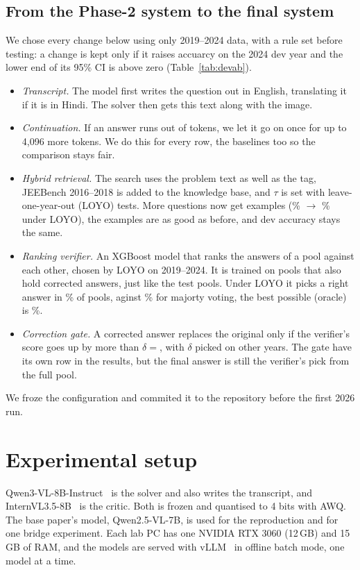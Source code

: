 \documentclass[conference]{IEEEtran}
\begin{document}
\subsection{From the Phase-2 system to the final system}
We chose every change below using only 2019--2024 data, with a rule set before testing: a
change is kept only if it raises accuarcy on the 2024 dev year and the lower end of its 95\% CI
is above zero (Table~\ref{tab:devab}).
\begin{itemize}
\item \emph{Transcript.} The model first writes the question out in English, translating it if
it is in Hindi. The solver then gets this text along with the image.
\item \emph{Continuation.} If an answer runs out of tokens, we let it go on once for up to
4{,}096 more tokens. We do this for every row, the baselines too so the comparison stays fair.
\item \emph{Hybrid retrieval.} The search uses the problem text as well as the tag, JEEBench
2016--2018 is added to the knowledge base, and $\tau$ is set with leave-one-year-out (LOYO) tests.
More questions now get examples (\RagCovTwo\% $\to$ \RagCovThree\% under LOYO), the examples are
as good as before, and dev accuracy stays the same.
\item \emph{Ranking verifier.} An XGBoost model that ranks the answers of a pool against each
other, chosen by LOYO on 2019--2024. It is trained on pools that also hold corrected answers,
just like the test pools. Under LOYO it picks a right answer in \VerLoyo\% of pools, aginst
\VerLoyoMaj\% for majorty voting, the best possible (oracle) is \VerLoyoOracle\%.
\item \emph{Correction gate.} A corrected answer replaces the original only if the verifier's
score goes up by more than $\delta{=}$\GateDelta, with $\delta$ picked on other years. The gate have its own row in the results, but the final answer is still the verifier's pick from the full
pool.
\end{itemize}
We froze the configuration and commited it to the repository before the first 2026 run.



\section{Experimental setup}
Qwen3-VL-8B-Instruct~\cite{qwen3vl} is the solver and also writes the transcript, and
InternVL3.5-8B~\cite{internvl35} is the critic. Both is frozen and quantised to 4 bits with AWQ. The base paper's model, Qwen2.5-VL-7B, is used for the reproduction and for one bridge
experiment. Each lab PC has one NVIDIA RTX 3060 (12\,GB) and 15\,GB of RAM, and the models are
served with vLLM~\cite{vllm} in offline batch mode, one model at a time.
\end{document}
